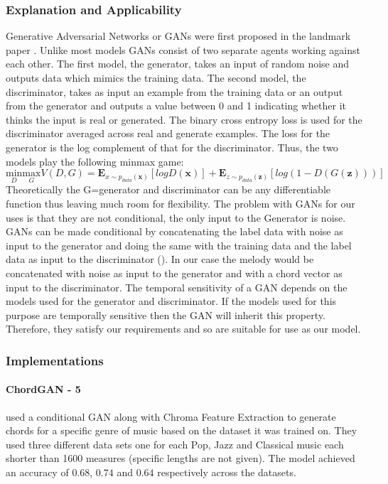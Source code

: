 \subsubsection{Explanation and Applicability}
Generative Adversarial Networks or GANs were first proposed in the landmark paper \cite{GANs}. Unlike most models GANs consist of two separate agents working against each other.
The first model, the generator, takes an input of random noise and outputs data which mimics the training data. 
The second model, the discriminator, takes as input an example from the training data or an output from the generator and outputs a value between 0 and 1 indicating whether it thinks the input is real or generated.
The binary cross entropy loss is used for the discriminator averaged across real and generate examples. The loss for the generator is the log complement of that for the discriminator. Thus, the two models play the following minmax game:
\begin{equation}
\underset{D}{\text{min}} \underset{G}{\text{max}} V(D,G) = \mathbf{E}_{x\sim p_{data}(\mathbf{x})}[logD(\mathbf{x})] + \mathbf{E}_{z\sim p_{data}(\mathbf{z})}[log(1-D(G(\mathbf{z})))]
\end{equation} 
Theoretically the G=generator and discriminator can be any differentiable function thus leaving much room for flexibility.
The problem with GANs for our uses is that they are not conditional, the only input to the Generator is noise.
GANs can be made conditional by concatenating the label data with noise as input to the generator and doing the same with the training data and the label data as input to the discriminator (\cite{CGANs}). 
In our case the melody would be concatenated with noise as input to the generator and with a chord vector as input to the discriminator.
The temporal sensitivity of a GAN depends on the models used for the generator and discriminator.
If the models used for this purpose are temporally sensitive then the GAN will inherit this property.
Therefore, they satisfy our requirements and so are suitable for use as our model. 

\subsubsection{Implementations}

\paragraph{ChordGAN - 5}  used a conditional GAN along with Chroma Feature Extraction to generate chords for a specific genre of music based on the dataset it was trained on.
They used three different data sets one for each Pop, Jazz and Classical music each shorter than 1600 measures (specific lengths are not given).
The model achieved an accuracy of $0.68$, $0.74$ and $0.64$ respectively across the datasets.

